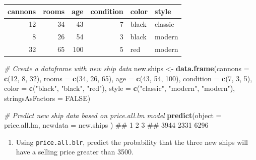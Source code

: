 \documentclass[]{book}
\newenvironment{Shaded}{\begin{snugshade}}{\end{snugshade}}
\newcommand{\KeywordTok}[1]{\textcolor[rgb]{0.13,0.29,0.53}{\textbf{#1}}}
\newcommand{\DataTypeTok}[1]{\textcolor[rgb]{0.13,0.29,0.53}{#1}}
\newcommand{\DecValTok}[1]{\textcolor[rgb]{0.00,0.00,0.81}{#1}}
\newcommand{\StringTok}[1]{\textcolor[rgb]{0.31,0.60,0.02}{#1}}
\newcommand{\CommentTok}[1]{\textcolor[rgb]{0.56,0.35,0.01}{\textit{#1}}}
\newcommand{\OtherTok}[1]{\textcolor[rgb]{0.56,0.35,0.01}{#1}}
\newcommand{\NormalTok}[1]{#1}
\providecommand{\tightlist}{%
  \setlength{\itemsep}{0pt}\setlength{\parskip}{0pt}}
\theoremstyle{definition}
\theoremstyle{definition}
\theoremstyle{remark}
\begin{document}
\begin{tabular}{r|r|r|r|l|l}
\hline
cannons & rooms & age & condition & color & style\\
\hline
12 & 34 & 43 & 7 & black & classic\\
\hline
8 & 26 & 54 & 3 & black & modern\\
\hline
32 & 65 & 100 & 5 & red & modern\\
\hline
\end{tabular}

\begin{Shaded}
\begin{Highlighting}[]
\CommentTok{# Create a dataframe with new ship data}
\NormalTok{new.ships <-}\StringTok{ }\KeywordTok{data.frame}\NormalTok{(}\DataTypeTok{cannons =} \KeywordTok{c}\NormalTok{(}\DecValTok{12}\NormalTok{, }\DecValTok{8}\NormalTok{, }\DecValTok{32}\NormalTok{),}
                  \DataTypeTok{rooms =} \KeywordTok{c}\NormalTok{(}\DecValTok{34}\NormalTok{, }\DecValTok{26}\NormalTok{, }\DecValTok{65}\NormalTok{),}
                  \DataTypeTok{age =} \KeywordTok{c}\NormalTok{(}\DecValTok{43}\NormalTok{, }\DecValTok{54}\NormalTok{, }\DecValTok{100}\NormalTok{),}
                  \DataTypeTok{condition =} \KeywordTok{c}\NormalTok{(}\DecValTok{7}\NormalTok{, }\DecValTok{3}\NormalTok{, }\DecValTok{5}\NormalTok{),}
                  \DataTypeTok{color =} \KeywordTok{c}\NormalTok{(}\StringTok{"black"}\NormalTok{, }\StringTok{"black"}\NormalTok{, }\StringTok{"red"}\NormalTok{),}
                  \DataTypeTok{style =} \KeywordTok{c}\NormalTok{(}\StringTok{"classic"}\NormalTok{, }\StringTok{"modern"}\NormalTok{, }\StringTok{"modern"}\NormalTok{),}
                  \DataTypeTok{stringsAsFactors =} \OtherTok{FALSE}\NormalTok{)}

\CommentTok{# Predict new ship data based on price.all.lm model}
\KeywordTok{predict}\NormalTok{(}\DataTypeTok{object =}\NormalTok{ price.all.lm,}
        \DataTypeTok{newdata =}\NormalTok{ new.ships}
\NormalTok{        )}
\NormalTok{##    1    2    3 }
\NormalTok{## 3944 2331 6296}
\end{Highlighting}
\end{Shaded}

\begin{enumerate}
\def\labelenumi{\arabic{enumi}.}
\setcounter{enumi}{7}
\tightlist
\item
  Using \texttt{price.all.blr}, predict the probability that the three
  new ships will have a selling price greater than 3500.
\end{enumerate}
\end{document}
